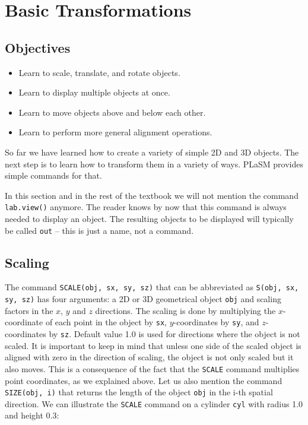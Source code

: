 \section{Basic Transformations}

\subsection{Objectives}
\begin{itemize}
\item Learn to scale, translate, and rotate objects.
\item Learn to display multiple objects at once.
\item Learn to move objects above and below each other.
\item Learn to perform more general alignment operations.
\end{itemize}
So far we have learned how to create a variety of simple 2D and 3D objects. 
The next step is to learn how to transform them in a variety of ways. PLaSM
provides simple commands for that. \\

\begin{gbox}
In this section and in the rest of the textbook we will not mention the command
{\tt lab.view()} anymore. The reader knows by now that this command is always needed 
to display an object. The resulting objects to be displayed will 
typically be called {\tt out} -- this is just a name, not a command.
\end{gbox}


\subsection{Scaling}

The command {\tt SCALE(obj, sx, sy, sz)} that can be abbreviated as 
{\tt S(obj, sx, sy, sz)} has four arguments: a 2D or 3D geometrical object {\tt obj} 
and scaling factors in the $x$, $y$ and $z$ directions. The scaling is done by
multiplying the $x$-coordinate of each point in the object by {\tt sx}, $y$-coordinates
by {\tt sy}, and $z$-coordinates by {\tt sz}. Default value 1.0 is used for directions where 
the object is not scaled. It is important to keep in mind that unless 
one side of the scaled object is aligned with zero in the direction of scaling, 
the object is not only scaled but it also moves. This is a consequence of the 
fact that the {\tt SCALE} command multiplies point coordinates, as we explained above. 
Let us also mention the command {\tt SIZE(obj, i)} that returns the length of 
the object {\tt obj} in the i-th spatial direction.
We can illustrate the {\tt SCALE} command on a cylinder {\tt cyl} with radius 1.0 
and height 0.3:\\

